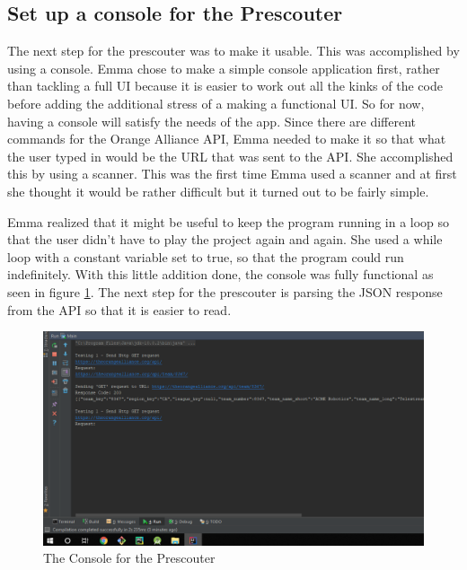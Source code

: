\documentclass{article}
\begin{document}
\subsection{Set up a console for the Prescouter}
The next step for the prescouter was to make it usable. This was accomplished by using a console. Emma chose to make a simple console application first, rather than tackling a full UI because it is easier to work out all the kinks of the code before adding the additional stress of a making a functional UI. So for now, having a console will satisfy the needs of the app. Since there are different commands for the Orange Alliance API, Emma needed to make it so that what the user typed in would be the URL that was sent to the API. She accomplished this by using a scanner. This was the first time Emma used a scanner and at first she thought it would be rather difficult but it turned out to be fairly simple. 

Emma realized that it might be useful to keep the program running in a loop so that the user didn't have to play the project again and again. She used a while loop with a constant variable set to true, so that the program could run indefinitely. With this little addition done, the console was fully functional as seen in figure \ref{fig:console}. The next step for the prescouter is parsing the JSON response from the API so that it is easier to read. 

\begin{figure}
    \centering
    \includegraphics[width=.6 \textwidth]{15_12-10/images/console.png}
    \caption{The Console for the Prescouter}
    \label{fig:console}
\end{figure}
\end{document}
